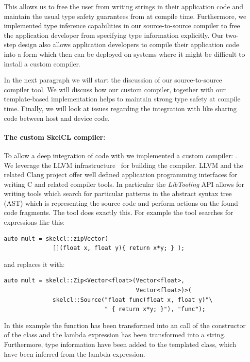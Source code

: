 This allows us to free the user from writing strings in their application code and maintain the usual type safety guarantees from \Cpp at compile time.
Furthermore, we implemented type inference capabilities in our source-to-source compiler to free the application developer from specifying type information explicitly.
Our two-step design also allows application developers to compile their application code into a form which then can be deployed on systems where it might be difficult to install a custom compiler.

In the next paragraph we will start the discussion of our source-to-source compiler tool.
We will discuss how our custom compiler, together with our template-based implementation helps to maintain strong type safety at compile time.
Finally, we will look at issues regarding the integration with \Cpp like sharing code between host and device code.

\paragraph{The custom SkelCL compiler: }
To allow a deep integration of \SkelCL code with \Cpp we implemented a custom compiler: .
We leverage the LLVM infrastructure~\cite{Lattner2004} for building the compiler.
LLVM and the related Clang project offer well defined application programming interfaces for writing C and \Cpp related compiler tools.
In particular the \emph{LibTooling} API allows for writing tools which search for particular patterns in the abstract syntax tree (AST) which is representing the source code and perform actions on the found code fragments.
The  tool does exactly this.
For example the tool searches for expressions like this:
\begin{lstlisting}[numbers=none,label={lst:skelclc:before},caption={Code snippet before transformation.}]
auto mult = skelcl::zipVector(
              [](float x, float y){ return x*y; } );
\end{lstlisting}
and replaces it with:
\begin{lstlisting}[numbers=none,label={lst:skelclc:after},caption={Code snippet after transformation.}]
auto mult = skelcl::Zip<Vector<float>(Vector<float>,
                                      Vector<float>)>(
              skelcl::Source("float func(float x, float y)"\
                             " { return x*y; }"), "func");
\end{lstlisting}

In this example the  function has been transformed into an call of the constructor of the  class and the lambda expression has been transformed into a string.
Furthermore, type information have been added to the templated \code{Zip} class, which have been inferred from the lambda expression.

